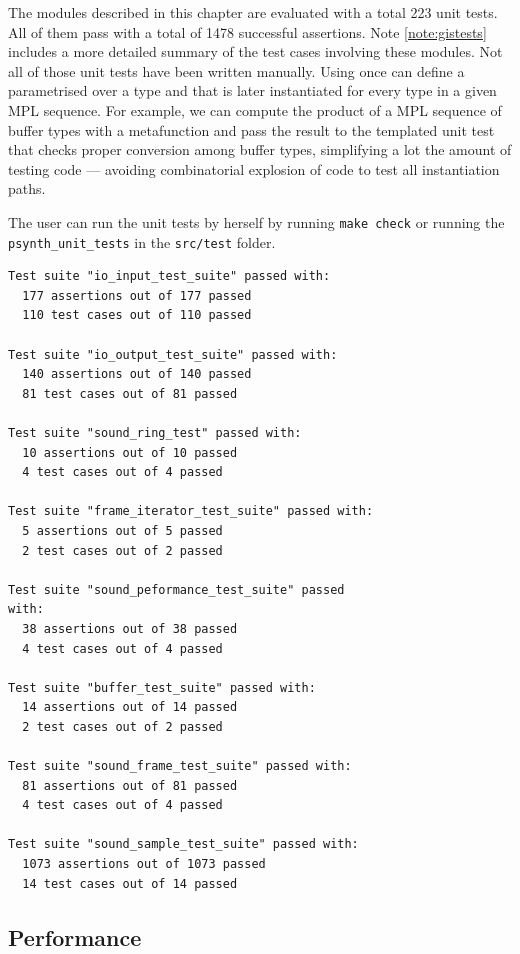  The modules described in this chapter are evaluated with
a total 223 unit tests. All of them pass with a total of 1478
successful assertions. Note \ref{note:gistests} includes a more
detailed summary of the test cases involving these modules. Not all of
those unit tests have been written manually. Using
 once can define a parametrised over
a type and that is later instantiated for every type in a given MPL
sequence. For example, we can compute the product of a MPL sequence of
buffer types with a metafunction and pass the result to the templated
unit test that checks proper conversion among buffer types,
simplifying a lot the amount of testing code --- avoiding
combinatorial explosion of code to test all instantiation paths.

\begin{mynote}
\label{note:gistests}
The user can run the unit tests by herself by running \texttt{make
  check} or running the \texttt{psynth\_unit\_tests} in the
\texttt{src/test} folder.
{\small
\begin{verbatim}
Test suite "io_input_test_suite" passed with:
  177 assertions out of 177 passed
  110 test cases out of 110 passed

Test suite "io_output_test_suite" passed with:
  140 assertions out of 140 passed
  81 test cases out of 81 passed

Test suite "sound_ring_test" passed with:
  10 assertions out of 10 passed
  4 test cases out of 4 passed

Test suite "frame_iterator_test_suite" passed with:
  5 assertions out of 5 passed
  2 test cases out of 2 passed

Test suite "sound_peformance_test_suite" passed 
with:
  38 assertions out of 38 passed
  4 test cases out of 4 passed

Test suite "buffer_test_suite" passed with:
  14 assertions out of 14 passed
  2 test cases out of 2 passed

Test suite "sound_frame_test_suite" passed with:
  81 assertions out of 81 passed
  4 test cases out of 4 passed

Test suite "sound_sample_test_suite" passed with:
  1073 assertions out of 1073 passed
  14 test cases out of 14 passed
\end{verbatim}
}
\end{mynote}

\subsection{Performance}

